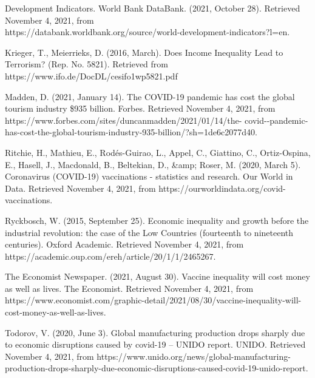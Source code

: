 \documentclass[fontsize=11pt]{article}
\begin{document}
    \item Development Indicators. World Bank DataBank. (2021, October 28). Retrieved November 4, 2021, from \\ \indent https://databank.worldbank.org/source/world-development-indicators?l=en. \\

    \item Krieger, T.,  Meierrieks, D. (2016, March).  Does Income Inequality Lead to Terrorism?  (Rep.  No.  5821). Retrieved \indent from https://www.ifo.de/DocDL/cesifo1wp5821.pdf \\

    \item Madden, D. (2021, January 14). The COVID-19 pandemic has cost the global tourism industry \$935 billion. \indent Forbes. Retrieved November 4, 2021, from https://www.forbes.com/sites/duncanmadden/2021/01/14/the- covid--pandemic-has-cost-the-global-tourism-industry-935-billion/?sh=1de6c2077d40. \\

    \item Ritchie, H., Mathieu, E., Rodés-Guirao, L., Appel, C., Giattino, C., Ortiz-Ospina, E., Hasell, J., Macdonald, B., \indent Beltekian, D., &amp; Roser, M. (2020, March 5). Coronavirus (COVID-19) vaccinations - statistics and research. \indent Our World in Data. Retrieved November 4, 2021, from https://ourworldindata.org/covid-vaccinations. \\

    \item Ryckbosch, W. (2015, September 25). Economic inequality and growth before the industrial revolution: the case \indent of the Low Countries (fourteenth to nineteenth centuries). Oxford Academic. Retrieved November 4, 2021, from \indent https://academic.oup.com/ereh/article/20/1/1/2465267. \\

    \item The Economist Newspaper. (2021, August 30). Vaccine inequality will cost money as well as lives. The Economist. \indent Retrieved November 4, 2021, from https://www.economist.com/graphic-detail/2021/08/30/vaccine-inequality-\indent will-cost-money-as-well-as-lives. \\

    \item Todorov, V. (2020, June 3). Global manufacturing production drops sharply due to economic disruptions caused \indent by covid-19 – UNIDO report. UNIDO. Retrieved November 4, 2021, from https://www.unido.org/news/global-\indent manufacturing-production-drops-sharply-due-economic-disruptions-caused-covid-19-unido-report. \\
\end{document}
